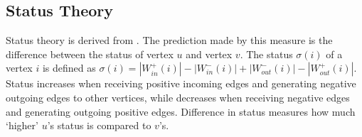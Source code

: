
\subsection{Status Theory}

Status theory is derived from \cite{}. The prediction made by this measure
is the difference between the status of vertex $u$ and vertex $v$. The status
$\sigma (i)$ of a vertex $i$ is defined as $\sigma (i) = |W^+_{in}(i)| - |W^-_{in}(i)| + |W^-_{out}(i)| - |W^+_{out}(i)|$.
Status increases when receiving positive incoming edges and generating negative 
outgoing edges to other vertices, while decreases when receiving negative edges 
and generating outgoing positive edges. Difference in status measures how much ‘higher’ $u’$s 
status is compared to $v’$s.

